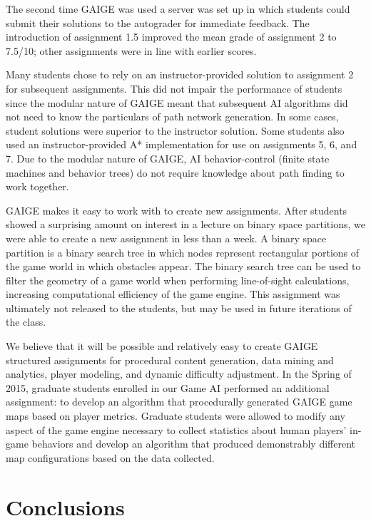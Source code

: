 \documentclass[letterpaper]{article}
\begin{document}
 
The second time GAIGE was used a server was set up in which students could submit their solutions to the autograder for immediate feedback.
The introduction of assignment 1.5 improved the mean grade of assignment 2 to 7.5/10; other assignments were in line with earlier scores. 

Many students chose to rely on an instructor-provided solution to assignment 2 for subsequent assignments. 
This did not impair the performance of students since the modular nature of GAIGE meant that subsequent AI algorithms did not need to know the particulars of path network generation.
In some cases, student solutions were superior to the instructor solution. 
Some students also used an instructor-provided A* implementation for use on assignments 5, 6, and 7.
Due to the modular nature of GAIGE, AI behavior-control (finite state machines and behavior trees) do not require knowledge about path finding to work together.

GAIGE makes it easy to work with to create new assignments.
After students showed a surprising amount on interest in a lecture on binary space partitions, we were able to create a new assignment in less than a week.
A binary space partition is a binary search tree in which nodes represent rectangular portions of the game world in which obstacles appear.
The binary search tree can be used to filter the geometry of a game world when performing line-of-sight calculations, increasing computational efficiency of the game engine.
This assignment was ultimately not released to the students, but may be used in future iterations of the class.

We believe that it will be possible and relatively easy to create GAIGE structured assignments for procedural content generation, data mining and analytics, player modeling, and dynamic difficulty adjustment.
In the Spring of 2015, graduate students enrolled in our Game AI performed an additional assignment: to develop an algorithm that procedurally generated GAIGE game maps based on player metrics.
Graduate students were allowed to modify any aspect of the game engine necessary to collect statistics about human players' in-game behaviors and develop an algorithm that produced demonstrably different map configurations based on the data collected.




\section{Conclusions}
\end{document}
